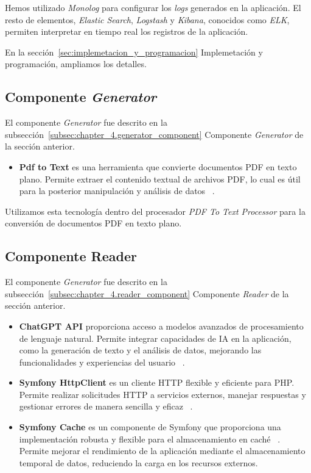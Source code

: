 Hemos utilizado \textit{Monolog} para configurar los \textit{logs} generados en la aplicación.
El resto de elementos, \textit{Elastic Search}, \textit{Logstash} y \textit{Kibana}, conocidos como \textit{ELK},
permiten interpretar en tiempo real los registros de la aplicación.

En la sección~\ref{sec:implemetacion_y_programacion} Implemetación y programación, ampliamos los detalles.

\subsection{Componente \textit{Generator}}

El componente \textit{Generator} fue descrito en la subsección~\ref{subsec:chapter_4.generator_component} Componente
\textit{Generator} de la sección anterior.

\begin{itemize}
    \item \textbf{Pdf to Text} es una herramienta que convierte documentos PDF en texto plano.
    Permite extraer el contenido textual de archivos PDF, lo cual es útil para la posterior manipulación y análisis de
    datos ~\cite{url_pdftotextl}.
\end{itemize}

Utilizamos esta tecnología dentro del procesador \textit{PDF To Text Processor} para la conversión de documentos PDF en
texto plano.

\subsection{Componente Reader}

El componente \textit{Generator} fue descrito en la subsección~\ref{subsec:chapter_4.reader_component} Componente
\textit{Reader} de la sección anterior.

\begin{itemize}
    \item \textbf{ChatGPT API} proporciona acceso a modelos avanzados de procesamiento de lenguaje natural.
    Permite integrar capacidades de IA en la aplicación, como la generación de texto y el análisis de datos, mejorando
    las funcionalidades y experiencias del usuario ~\cite{url_chatgpt_api}.
    \item \textbf{Symfony HttpClient} es un cliente HTTP flexible y eficiente para PHP. Permite realizar solicitudes
    HTTP a servicios externos, manejar respuestas y gestionar errores de manera sencilla y eficaz
    ~\cite{url_symfony_http}.
    \item \textbf{Symfony Cache} es un componente de Symfony que proporciona una implementación robusta y flexible
    para el almacenamiento en caché ~\cite{url_symfony_cache}.
    Permite mejorar el rendimiento de la aplicación mediante el almacenamiento temporal de datos, reduciendo la carga en
    los recursos externos.
\end{itemize}

